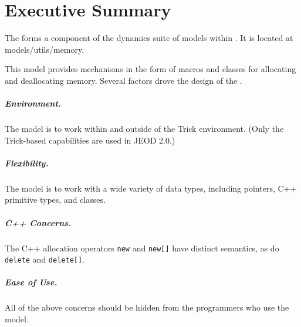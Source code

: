 %
%

\chapter*{Executive Summary}

The \ModelDesc forms a component of the dynamics suite of
models within \JEODid. It is located at
models/utils/memory.

This model provides mechanisms in the form of macros and classes
for allocating and deallocating memory.
Several factors drove the design of the \ModelDesc.

\paragraph*{Environment.}
The model is to work within and outside of the Trick environment.
(Only the Trick-based capabilities are used in JEOD 2.0.)

\paragraph*{Flexibility.}
The model is to work with a wide variety of data types, including
pointers, C++ primitive types, and classes.

\paragraph*{C++ Concerns.} The C++ allocation operators
\verb|new| and \verb|new[]| have distinct semantics,
as do \verb|delete| and \verb|delete[]|.

\paragraph*{Ease of Use.} All of the above concerns should
be hidden from the programmers who use the model.
